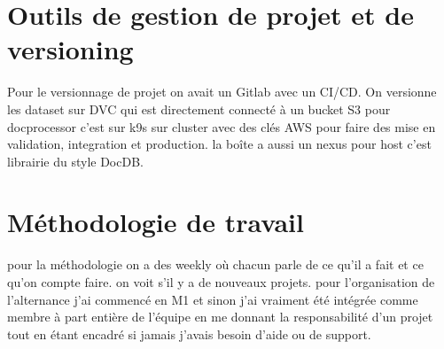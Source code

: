 \section{Outils de gestion de projet et de versioning}

Pour le versionnage de projet on avait un Gitlab avec un CI/CD. On versionne les dataset sur DVC qui est directement connecté à un bucket S3
pour docprocessor c'est sur k9s sur cluster avec des clés AWS pour faire des mise en validation, integration et production.
la boîte a aussi un nexus pour host c'est librairie du style DocDB.

\section{Méthodologie de travail}

pour la méthodologie on a des weekly où chacun parle de ce qu'il a fait et ce qu'on compte faire. on voit s'il y a de nouveaux projets.
pour l'organisation de l'alternance j'ai commencé en M1 et sinon j'ai vraiment été intégrée comme membre à part entière de l'équipe en me donnant la responsabilité d'un projet
tout en étant encadré si jamais j'avais besoin d'aide ou de support.
 
